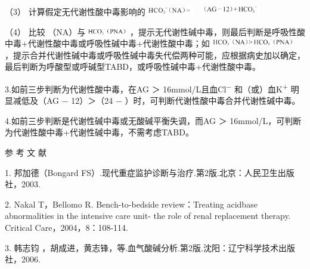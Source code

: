（3）
计算假定无代谢性酸中毒影响的\includegraphics[width=0.875in,height=0.15625in]{./images/Image00357.jpg}
\includegraphics[width=1.08333in,height=0.17708in]{./images/Image00358.jpg}

（4） 比较{}
（NA）与\includegraphics[width=0.72917in,height=0.13542in]{./images/Image00360.jpg}
，提示无代谢性碱中毒，则最后判断是呼吸性酸中毒+代谢性酸中毒或呼吸性碱中毒+代谢性酸中毒；如\includegraphics[width=1.5in,height=0.15625in]{./images/Image00361.jpg}
，提示合并代谢性碱中毒或呼吸性碱中毒失代偿两种可能，应根据病史加以确定，最后判断为呼酸型或呼碱型TABD，或呼吸性碱中毒+代谢性酸中毒。

3.如前三步判断为代谢性酸中毒，在AG ＞ 16mmol/L且血Cl\textsuperscript{−}
和（或）血K\textsuperscript{+} 明显减低及（AG − 12）＞（24 −{}
）时，可判断代谢性酸中毒合并代谢性碱中毒。

4.如前三步判断是代谢性碱中毒或无酸碱平衡失调，而AG ＞
16mmol/L，可判断为代谢性酸中毒+代谢性碱中毒，不需考虑TABD。

\protect\hypertarget{text00210.html}{}{}

\hypertarget{text00210.htmlux5cux23CHP6-5-9}{}
参 考 文 献

1. 邦加德（Bongard
FS）.现代重症监护诊断与治疗.第2版.北京：人民卫生出版社，2003.

2. Nakal T，Bellomo R. Bench-to-bedside review：Treating acidbase
abnormalities in the intensive care unit- the role of renal replacement
therapy. Critical Care，2004，8：108-114.

3. 韩志钧
，胡成进，黄志锋，等.血气酸碱分析.第2版.沈阳：辽宁科学技术出版社，2006.

\protect\hypertarget{text00211.html}{}{}


